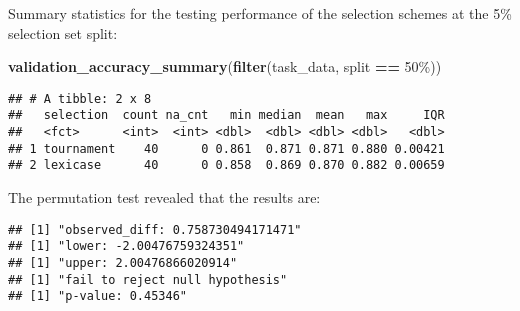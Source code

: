 \documentclass[
]{book}
\newenvironment{Shaded}{\begin{snugshade}}{\end{snugshade}}
\newcommand{\AttributeTok}[1]{\textcolor[rgb]{0.13,0.29,0.53}{#1}}
\newcommand{\DecValTok}[1]{\textcolor[rgb]{0.00,0.00,0.81}{#1}}
\newcommand{\FunctionTok}[1]{\textcolor[rgb]{0.13,0.29,0.53}{\textbf{#1}}}
\newcommand{\NormalTok}[1]{#1}
\newcommand{\OtherTok}[1]{\textcolor[rgb]{0.56,0.35,0.01}{#1}}
\newcommand{\SpecialCharTok}[1]{\textcolor[rgb]{0.81,0.36,0.00}{\textbf{#1}}}
\newcommand{\StringTok}[1]{\textcolor[rgb]{0.31,0.60,0.02}{#1}}
\begin{document}
Summary statistics for the testing performance of the selection schemes at the 5\% selection set split:

\begin{Shaded}
\begin{Highlighting}[]
\FunctionTok{validation\_accuracy\_summary}\NormalTok{(}\FunctionTok{filter}\NormalTok{(task\_data, split }\SpecialCharTok{==} \StringTok{\textquotesingle{}50\%\textquotesingle{}}\NormalTok{))}
\end{Highlighting}
\end{Shaded}

\begin{verbatim}
## # A tibble: 2 x 8
##   selection  count na_cnt   min median  mean   max     IQR
##   <fct>      <int>  <int> <dbl>  <dbl> <dbl> <dbl>   <dbl>
## 1 tournament    40      0 0.861  0.871 0.871 0.880 0.00421
## 2 lexicase      40      0 0.858  0.869 0.870 0.882 0.00659
\end{verbatim}

The permutation test revealed that the results are:

\begin{Shaded}
\end{Shaded}

\begin{verbatim}
## [1] "observed_diff: 0.758730494171471"
## [1] "lower: -2.00476759324351"
## [1] "upper: 2.00476866020914"
## [1] "fail to reject null hypothesis"
## [1] "p-value: 0.45346"
\end{verbatim}
\end{document}
